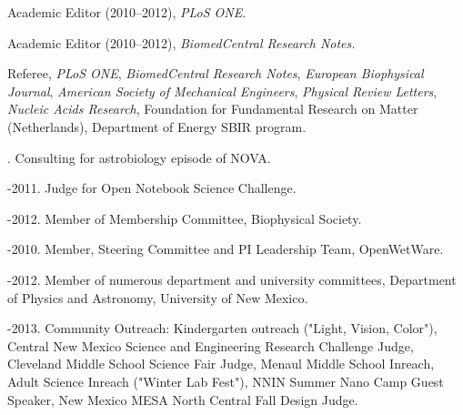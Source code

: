 \documentclass[11pt]{article}
\begin{document}
\medskip

\ind Academic Editor (2010–2012), \emph{PLoS ONE}.

\ind Academic Editor (2010–2012), \emph{BiomedCentral Research Notes.}

\ind Referee, \emph{PLoS ONE}, \emph{BiomedCentral Research Notes},
\emph{European Biophysical Journal}, \emph{American Society of Mechanical Engineers}, \emph{Physical Review Letters}, \emph{Nucleic Acids Research}, Foundation for Fundamental Research on Matter (Netherlands), Department of Energy SBIR program.

. Consulting for astrobiology episode of NOVA.

-2011. Judge for Open Notebook Science Challenge.

-2012. Member of Membership Committee, Biophysical Society.

-2010. Member, Steering Committee and PI Leadership Team, OpenWetWare. 

-2012. Member of numerous department and university committees, Department of Physics and Astronomy, University of New Mexico.

-2013. Community Outreach: Kindergarten outreach ("Light, Vision, Color"), Central New Mexico Science and Engineering Research Challenge Judge, Cleveland Middle School Science Fair Judge, Menaul Middle School Inreach, Adult Science Inreach ("Winter Lab Fest"), NNIN Summer Nano Camp Guest Speaker, New Mexico MESA North Central Fall Design Judge.
\end{document}
